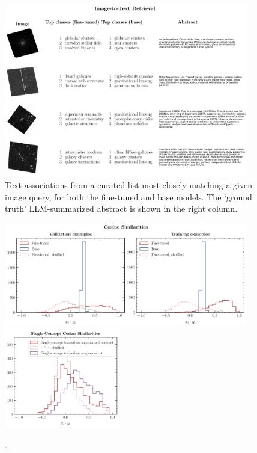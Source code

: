 \documentclass[10pt]{article} %
\begin{document}
\begin{figure}[!h]
\includegraphics[width=0.95\textwidth]{plots/itt.pdf}
\caption{Text associations from a curated list most closely matching a given image query, for both the fine-tuned and base models. The `ground truth' LLM-summarized abstract is shown in the right column.}
\label{fig:itt}
\end{figure}

\begin{figure}[!h]
\includegraphics[width=0.95\textwidth]{plots/sim_valtrain.pdf}
\centering\includegraphics[width=0.45\textwidth]{plots/sim_summ1.pdf}
\caption{.}
\label{fig:sim_valtrain}
\end{figure}
\end{document}
